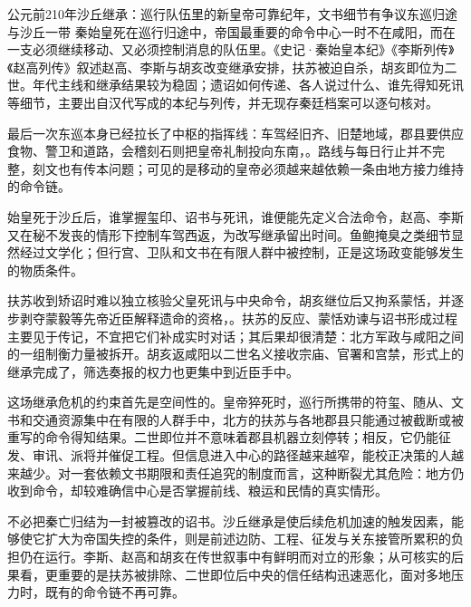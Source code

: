 \begin{event}{公元前210年}{沙丘继承：巡行队伍里的新皇帝}{可靠纪年，文书细节有争议}{东巡归途与沙丘一带}
秦始皇死在巡行归途中，帝国最重要的命令中心一时不在咸阳，而在一支必须继续移动、又必须控制消息的队伍里。《史记·秦始皇本纪》《李斯列传》《赵高列传》叙述赵高、李斯与胡亥改变继承安排，扶苏被迫自杀，胡亥即位为二世。年代主线和继承结果较为稳固；遗诏如何传递、各人说过什么、谁先得知死讯等细节，主要出自汉代写成的本纪与列传，并无现存秦廷档案可以逐句核对。

最后一次东巡本身已经拉长了中枢的指挥线：车驾经旧齐、旧楚地域，郡县要供应食物、警卫和道路，会稽刻石则把皇帝礼制投向东南，。路线与每日行止并不完整，刻文也有传本问题；可见的是移动的皇帝必须越来越依赖一条由地方接力维持的命令链。

始皇死于沙丘后，谁掌握玺印、诏书与死讯，谁便能先定义合法命令，赵高、李斯又在秘不发丧的情形下控制车驾西返，为改写继承留出时间。鱼鲍掩臭之类细节显然经过文学化；但行宫、卫队和文书在有限人群中被控制，正是这场政变能够发生的物质条件。

扶苏收到矫诏时难以独立核验父皇死讯与中央命令，胡亥继位后又拘系蒙恬，并逐步剥夺蒙毅等先帝近臣解释遗命的资格，。扶苏的反应、蒙恬劝谏与诏书形成过程主要见于传记，不宜把它们补成实时对话；其后果却很清楚：北方军政与咸阳之间的一组制衡力量被拆开。胡亥返咸阳以二世名义接收宗庙、官署和宫禁，形式上的继承完成了，筛选奏报的权力也更集中到近臣手中。

这场继承危机的约束首先是空间性的。皇帝猝死时，巡行所携带的符玺、随从、文书和交通资源集中在有限的人群手中，北方的扶苏与各地郡县只能通过被截断或被重写的命令得知结果。二世即位并不意味着郡县机器立刻停转；相反，它仍能征发、审讯、派将并催促工程。但信息进入中心的路径越来越窄，能校正决策的人越来越少。对一套依赖文书期限和责任追究的制度而言，这种断裂尤其危险：地方仍收到命令，却较难确信中心是否掌握前线、粮运和民情的真实情形。

不必把秦亡归结为一封被篡改的诏书。沙丘继承是使后续危机加速的触发因素，能够使它扩大为帝国失控的条件，则是前述边防、工程、征发与关东接管所累积的负担仍在运行。李斯、赵高和胡亥在传世叙事中有鲜明而对立的形象；从可核实的后果看，更重要的是扶苏被排除、二世即位后中央的信任结构迅速恶化，面对多地压力时，既有的命令链不再可靠。
\end{event}


